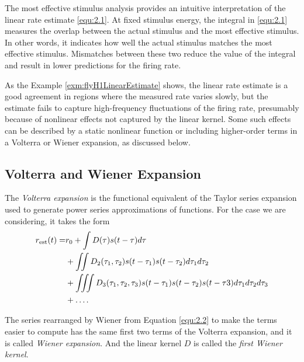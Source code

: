 \begin{rem}
  The most effective stimulus analysis provides an intuitive interpretation of the linear rate estimate \ref{equ:2.1}. At fixed stimulus energy, the integral in \ref{equ:2.1} measures the overlap between the actual stimulus and the most effective stimulus. In other words, it indicates how well the actual stimulus matches the most effective stimulus. Mismatches between these two reduce the value of the integral and result in lower predictions for the firing
rate.
\end{rem}

\begin{rem}
  As the Example \ref{exm:flyH1LinearEstimate} shows, the linear rate estimate is a good agreement in regions where the measured rate varies slowly, but the estimate fails to capture high-frequency fluctuations of the firing rate, presumably because of nonlinear effects not captured by the linear kernel. Some such effects can be described by a static nonlinear function or including higher-order terms in a Volterra or Wiener expansion, as discussed below.
\end{rem}

\subsection{ Volterra and Wiener Expansion}
\begin{defn}
  \label{VolterraExpansion}
  The \emph{Volterra expansion} is the functional equivalent of the Taylor series expansion used to generate power series approximations of functions. For the case we are considering, it takes the form
  \begin{equation}
    \label{equ:2.2}
    \begin{aligned}
      r_{\rm{est}}(t) = &r_0 + \int D(\tau)s(t-\tau)d\tau \\
      &+ \iint D_2(\tau_1,\tau_2)s(t-\tau_1)s(t-\tau_2)d\tau_1d\tau_2 \\
      &+ \iiint D_3(\tau_1,\tau_2,\tau_3)s(t-\tau_1)s(t-\tau_2)s(t-\tau3)d\tau_1d\tau_2d\tau_3 \\
      &+ \dots.
    \end{aligned}
  \end{equation}
\end{defn}

\begin{defn}
  \label{WienerExpansion}
  The series rearranged by Wiener from Equation \ref{equ:2.2} to make the terms easier to compute has the same first two terms of the Volterra expansion, and it is called \emph{Wiener expansion}.
  And the linear kernel $D$ is called the \emph{first Wiener kernel}.
\end{defn}

